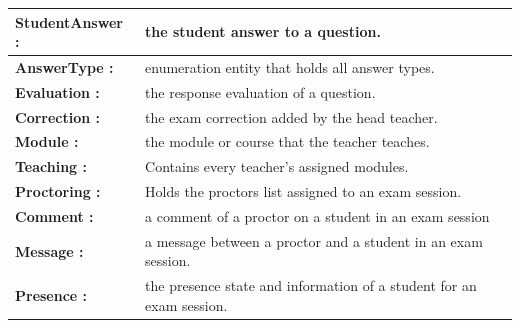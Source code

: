 \documentclass[]{uc2pfecaneva}
\begin{document}
\begin{table}[h]
\begin{tabularx}{\textwidth}{|l|X|}
            \textbf{StudentAnswer :} & the student answer to a question.\\ \hline
            \textbf{AnswerType :} & enumeration entity that holds all answer types.\\ \hline
            \textbf{Evaluation :} & the response evaluation of a question.\\ \hline
            \textbf{Correction :} & the exam correction added by the head teacher.\\ \hline
            \textbf{Module :} & the module or course that the teacher teaches.\\ \hline
            \textbf{Teaching :} & Contains every teacher's assigned modules.\\ \hline
            \textbf{Proctoring :} & Holds the proctors list assigned to an exam session.\\ \hline
            \textbf{Comment :} & a comment of a proctor on a student in an exam session\\ \hline
            \textbf{Message :} & a message between a proctor and a student in an exam session.\\ \hline
            \textbf{Presence :} & the presence state and information of a student for an exam session.\\ \hline
        \end{tabularx}
        \label{table:1}
    \end{table}

    \clearpage
\end{document}
